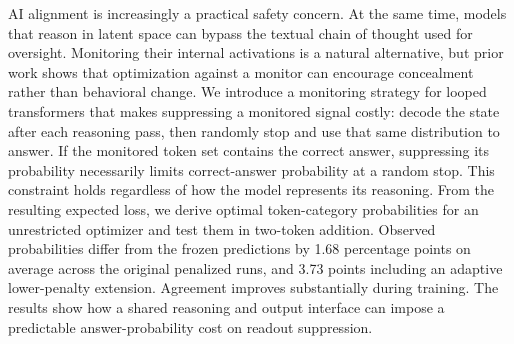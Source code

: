 AI alignment is increasingly a practical safety concern. At the same time, models that reason in latent space can bypass the textual chain of thought used for oversight. Monitoring their internal activations is a natural alternative, but prior work shows that optimization against a monitor can encourage concealment rather than behavioral change. We introduce a monitoring strategy for looped transformers that makes suppressing a monitored signal costly: decode the state after each reasoning pass, then randomly stop and use that same distribution to answer. If the monitored token set contains the correct answer, suppressing its probability necessarily limits correct-answer probability at a random stop. This constraint holds regardless of how the model represents its reasoning. From the resulting expected loss, we derive optimal token-category probabilities for an unrestricted optimizer and test them in two-token addition. Observed probabilities differ from the frozen predictions by 1.68 percentage points on average across the original penalized runs, and 3.73 points including an adaptive lower-penalty extension. Agreement improves substantially during training. The results show how a shared reasoning and output interface can impose a predictable answer-probability cost on readout suppression.
